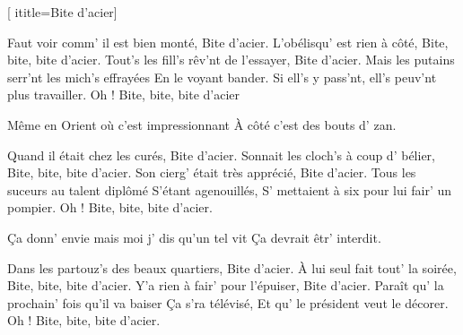[
  ititle={Bite d'acier}]

  
\beginverse
Faut voir comm' il est bien monté,
Bite d'acier.
L'obélisqu' est rien à côté,
Bite, bite, bite d'acier.
Tout's les fill's rêv'nt de l'essayer,
Bite d'acier.
Mais les putains serr'nt les mich's effrayées
En le voyant bander.
Si ell's y pass'nt, ell's peuv'nt plus travailler.
Oh ! Bite, bite, bite d'acier
\endverse

\beginverse
{}
Même en Orient où c'est impressionnant
À côté c'est des bouts d' zan.
\endverse

\beginverse
Quand il était chez les curés,
Bite d'acier.
Sonnait les cloch's à coup d' bélier,
Bite, bite, bite d'acier.
Son cierg' était très apprécié,
Bite d'acier.
Tous les suceurs au talent diplômé
S'étant agenouillés,
S' mettaient à six pour lui fair' un pompier.
Oh ! Bite, bite, bite d'acier.
\endverse

\beginverse
{}
Ça donn' envie mais moi j' dis qu'un tel vit
Ça devrait êtr' interdit.
\endverse

\beginverse
Dans les partouz's des beaux quartiers,
Bite d'acier.
À lui seul fait tout' la soirée,
Bite, bite, bite d'acier.
Y'a rien à fair' pour l'épuiser,
Bite d'acier.
Paraît qu' la prochain' fois qu'il va baiser
Ça s'ra télévisé,
Et qu' le président veut le décorer.
Oh ! Bite, bite, bite d'acier.
\endverse

\endsong
